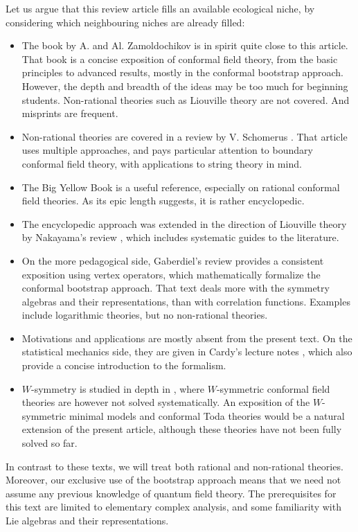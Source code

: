 \documentclass[12pt,a4paper,notitlepage]{report}
\numberwithin{equation}{section}
\theoremstyle{break}
\begin{document}
Let us argue that this review article fills an available ecological niche, by considering which neighbouring niches are already filled: 
\begin{itemize}
\item 
The book \cite{zz90} by A. and Al. Zamoldochikov is in spirit quite close to this article. That book is a concise exposition of conformal field theory, from the basic principles to advanced results, mostly in the conformal bootstrap approach. However, the depth and breadth of the ideas may be too much for beginning students. Non-rational theories such as Liouville theory are not covered. And misprints are frequent.
\item
Non-rational theories are covered in a review by V. Schomerus \cite{sch05}. That article uses multiple approaches, and pays particular attention to boundary conformal field theory, with applications to string theory in mind. 
\item
The Big Yellow Book \cite{fms97} is a useful reference, especially on rational conformal field theories. As its epic length suggests, it is rather encyclopedic. 
\item
The encyclopedic approach was extended in the direction of Liouville theory by Nakayama's review \cite{nak04}, which includes systematic guides to the literature.
\item 
On the more pedagogical side, Gaberdiel's review \cite{gab99} provides a consistent exposition using vertex operators, which mathematically formalize the conformal bootstrap approach. That text deals more with the symmetry algebras and their representations, than with correlation functions. Examples include logarithmic theories, but no non-rational theories.
\item
Motivations and applications are mostly absent from the present text. On the statistical mechanics side, they are given in Cardy's lecture notes \cite{car08}, which also provide a concise introduction to the formalism.
\item 
$W$-symmetry is studied in depth in \cite{bs92}, where $W$-symmetric conformal field theories are however not solved systematically. An exposition of the $W$-symmetric minimal models and conformal Toda theories would be a natural extension of the present article, although these theories have not been fully solved so far. 
\end{itemize}
In contrast to these texts, we will treat both rational and non-rational theories. Moreover, our exclusive use of the bootstrap approach means that we need not assume any previous knowledge of quantum field theory. The prerequisites for this text are limited to 
elementary complex analysis, and some familiarity with Lie algebras and their representations.
\end{document}
